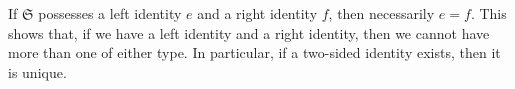 If $\mathfrak{S}$ possesses a left identity $e$ and a right identity $f$, then necessarily $e = f$. This shows that, if we have a left identity and a right identity, then we cannot have more than one of either type. In particular, if a two-sided identity exists, then it is unique.
